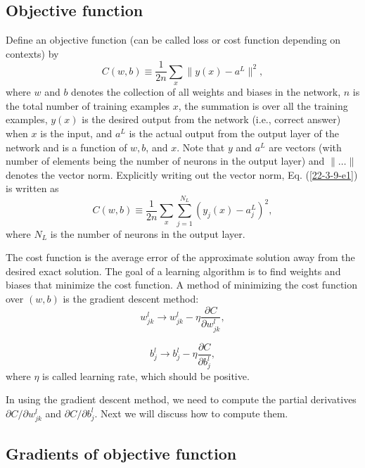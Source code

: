 \documentclass{article}
\begin{document}
\subsection{Objective function}

Define an objective function (can be called loss or cost function depending on
contexts) by
\begin{equation}
  \label{22-3-9-e1} C (w, b) \equiv \frac{1}{2 n} \sum_x \| y (x) - a^L \|^2,
\end{equation}
where $w$ and $b$ denotes the collection of all weights and biases in the
network, $n$ is the total number of training examples $x$, the summation is
over all the training examples, $y (x)$ is the desired output from the network
(i.e., correct answer) when $x$ is the input, and $a^L$ is the actual output
from the output layer of the network and is a function of $w, b$, and $x$.
Note that $y$ and $a^L$ are vectors (with number of elements being the number
of neurons in the output layer) and $\| \ldots \|$ denotes the vector norm.
Explicitly writing out the vector norm, Eq. (\ref{22-3-9-e1}) is written as
\begin{equation}
  \label{22-3-9-e1m} C (w, b) \equiv \frac{1}{2 n} \sum_x \sum^{N_L}_{j = 1}
  (y_j (x) - a^L_j)^2,
\end{equation}
where $N_L$ is the number of neurons in the output layer.

The cost function is the average error of the approximate solution away from
the desired exact solution. The goal of a learning algorithm is to find
weights and biases that minimize the cost function. A method of minimizing the
cost function over $(w, b)$ is the gradient descent method:
\begin{equation}
  w_{j k}^l \rightarrow w_{j k}^l - \eta \frac{\partial C}{\partial w_{j
  k}^l},
\end{equation}

\begin{equation}
  b_j^l \rightarrow b_j^l - \eta \frac{\partial C}{\partial b_j^l},
\end{equation}
where $\eta$ is called learning rate, which should be positive.

In using the gradient descent method, we need to compute the partial
derivatives $\partial C / \partial w^l_{j k}$ and $\partial C / \partial
b^l_j$. Next we will discuss how to compute them.

\subsection{Gradients of objective function}
\end{document}
